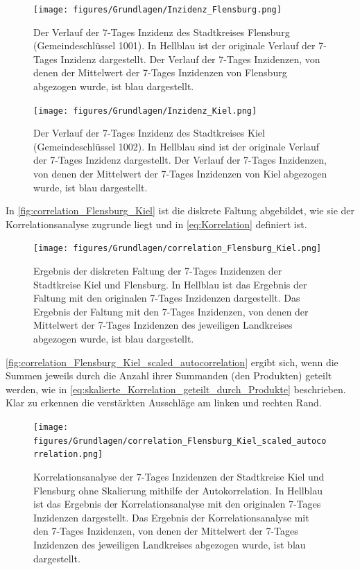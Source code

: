 \begin{figure}[H]
    \centering
    \texttt{[image: figures/Grundlagen/Inzidenz\_Flensburg.png]}
    \caption{Der Verlauf der 7-Tages Inzidenz des Stadtkreises Flensburg (Gemeindeschlüssel 1001).
    In Hellblau ist der originale Verlauf der 7-Tages Inzidenz dargestellt. Der Verlauf der 7-Tages Inzidenzen, von denen der Mittelwert der 7-Tages Inzidenzen von Flensburg abgezogen wurde, ist blau dargestellt.}
    \label{fig:Inzidenz_Flensburg}
\end{figure}
\begin{figure}[H]
    \centering
    \texttt{[image: figures/Grundlagen/Inzidenz\_Kiel.png]}
    \caption{Der Verlauf der 7-Tages Inzidenz des Stadtkreises Kiel (Gemeindeschlüssel 1002).
    In Hellblau sind ist der originale Verlauf der 7-Tages Inzidenz dargestellt. Der Verlauf der 7-Tages Inzidenzen, von denen der Mittelwert der 7-Tages Inzidenzen von Kiel abgezogen wurde, ist blau dargestellt.}
    \label{fig:Inzidenz_Kiel}
\end{figure}
In \autoref{fig:correlation_Flensburg_Kiel} ist die diskrete Faltung abgebildet, wie sie der Korrelationsanalyse zugrunde liegt und in \autoref{eq:Korrelation} definiert ist.
\begin{figure}[H]
    \centering
    \texttt{[image: figures/Grundlagen/correlation\_Flensburg\_Kiel.png]}
    \caption{Ergebnis der diskreten Faltung der 7-Tages Inzidenzen der Stadtkreise Kiel und Flensburg.
    In Hellblau ist das Ergebnis der Faltung mit den originalen 7-Tages Inzidenzen dargestellt. Das Ergebnis der Faltung mit den 7-Tages Inzidenzen, von denen der Mittelwert der 7-Tages Inzidenzen des jeweiligen Landkreises abgezogen wurde, ist blau dargestellt.}
    \label{fig:correlation_Flensburg_Kiel}
\end{figure}
\autoref{fig:correlation_Flensburg_Kiel_scaled_autocorrelation} ergibt sich, wenn die Summen jeweils durch die Anzahl ihrer Summanden (den Produkten) geteilt werden, wie in \autoref{eq:skalierte_Korrelation_geteilt_durch_Produkte} beschrieben. Klar zu erkennen die verstärkten Ausschläge am linken und rechten Rand.
\begin{figure}[H]
    \centering
    \texttt{[image: figures/Grundlagen/correlation\_Flensburg\_Kiel\_scaled\_autocorrelation.png]}
    \caption{Korrelationsanalyse der 7-Tages Inzidenzen der Stadtkreise Kiel und Flensburg ohne Skalierung mithilfe der Autokorrelation.
    In Hellblau ist das Ergebnis der Korrelationsanalyse mit den originalen 7-Tages Inzidenzen dargestellt. Das Ergebnis der Korrelationsanalyse mit den 7-Tages Inzidenzen, von denen der Mittelwert der 7-Tages Inzidenzen des jeweiligen Landkreises abgezogen wurde, ist blau dargestellt.}
    \label{fig:correlation_Flensburg_Kiel_scaled_autocorrelation}
\end{figure}
